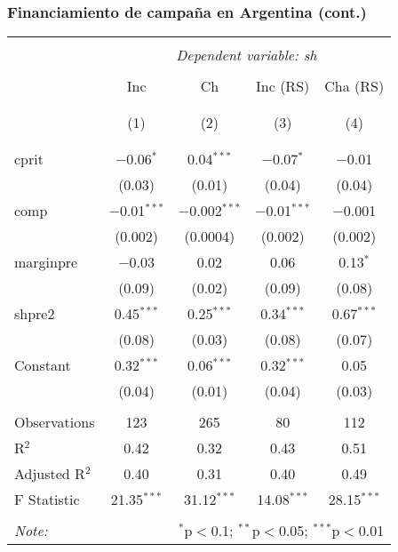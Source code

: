 \documentclass[handout,final,xcolor=dvipsnames]{beamer}
\begin{document}
\begin{frame}\frametitle{Financiamiento de campaña en Argentina (cont.)}
\begin{table}[!h] \centering
\scriptsize
\begin{tabular}{@{\extracolsep{0pt}}lcccc}
\\[-1.8ex]\hline
\hline \\[-1.8ex]
 & \multicolumn{4}{c}{\textit{Dependent variable: sh}} \\
\\[-1.8ex] & Inc & Ch & Inc (RS) & Cha (RS)\\
\hline \\[-1.8ex]
\\[-1.8ex] & (1) & (2) & (3) & (4)\\
\hline \\[-1.8ex]\\
 cprit & $-$0.06$^{*}$ & 0.04$^{***}$ & $-$0.07$^{*}$ & $-$0.01 \\
  & (0.03) & (0.01) & (0.04) & (0.04) \\
  comp & $-$0.01$^{***}$ & $-$0.002$^{***}$ & $-$0.01$^{***}$ & $-$0.001 \\
  & (0.002) & (0.0004) & (0.002) & (0.002) \\
  marginpre & $-$0.03 & 0.02 & 0.06 & 0.13$^{*}$ \\
  & (0.09) & (0.02) & (0.09) & (0.08) \\
  shpre2 & 0.45$^{***}$ & 0.25$^{***}$ & 0.34$^{***}$ & 0.67$^{***}$ \\
  & (0.08) & (0.03) & (0.08) & (0.07) \\
  Constant & 0.32$^{***}$ & 0.06$^{***}$ & 0.32$^{***}$ & 0.05 \\
  & (0.04) & (0.01) & (0.04) & (0.03) \\
 \hline \\[-1.8ex]
Observations & 123 & 265 & 80 & 112 \\
R$^{2}$ & 0.42 & 0.32 & 0.43 & 0.51 \\
Adjusted R$^{2}$ & 0.40 & 0.31 & 0.40 & 0.49 \\
F Statistic & 21.35$^{***}$ & 31.12$^{***}$ & 14.08$^{***}$ & 28.15$^{***}$ \\
\hline
\hline \\[-1.8ex]
\textit{Note:}  & \multicolumn{4}{r}{$^{*}$p$<$0.1; $^{**}$p$<$0.05; $^{***}$p$<$0.01} \\
\end{tabular}
\end{table}
\end{frame}
\end{document}
